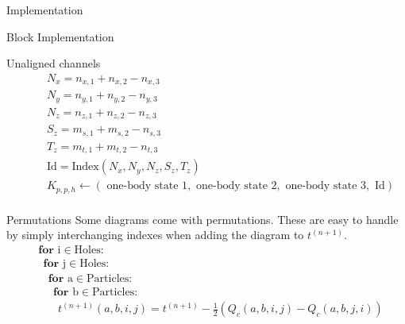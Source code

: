 \documentclass[twoside,english]{uiofysmaster}
\begin{document}
\begin{chapter}{Implementation}
\begin{section}{Block Implementation}
\begin{subsection}{Unaligned channels}
\begin{align*}
				&\:\:\:\:\:\:\:\: N_x = n_{x,1} + n_{x,2} - n_{x,3}\\
				&\:\:\:\:\:\:\:\: N_y = n_{y,1} + n_{y,2} - n_{y,3}\\
				&\:\:\:\:\:\:\:\: N_z = n_{z,1} + n_{z,2} - n_{z,3}\\
 				&\:\:\:\:\:\:\:\: S_z = m_{s,1} + m_{s,2} - n_{s,3}\\
				&\:\:\:\:\:\:\:\: T_z = m_{t,1} + m_{t,2} - n_{t,3}\\
				&\:\:\:\:\:\:\:\: \text{Id} = \text{Index}(N_x,N_y,N_z,S_z,T_z) \\
				&\:\:\:\:\:\:\:\: K_{p,p,h} \leftarrow (\text{ one-body state 1}, \text{ one-body state 2}, \text{ one-body state 3},  \text{ Id}) \\
			\end{align*}
		\end{subsection}

		\begin{subsection}{Permutations}
			Some diagrams come with permutations. These are easy to handle by simply interchanging indexes when adding the diagram to $t^{(n+1)}$. 
			\begin{align*}
				&\mathbf{for } \text{ i} \in \text{Holes}: \\
				&\:\:\mathbf{for } \text{ j} \in \text{Holes}: \\
				&\:\:\:\:\mathbf{for } \text{ a} \in \text{Particles}: \\
				&\:\:\:\:\:\:\mathbf{for } \text{ b} \in \text{Particles}: \\
				&\:\:\:\:\:\:\:\: t^{(n+1)}(a,b,i,j) = t^{(n+1)} - \frac{1}{2}\left(Q_c(a,b,i,j) - Q_c(a,b,j,i)\right)
			\end{align*}
		\end{subsection}

	\end{section}


\end{chapter}
\end{document}
